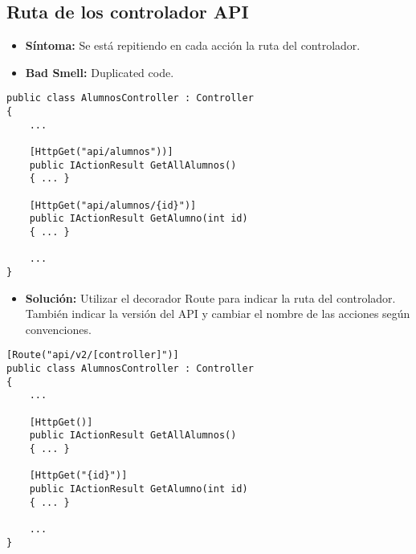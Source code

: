 \subsection{Ruta de los controlador API}
\begin{itemize}
	\item \textbf{Síntoma:} Se está repitiendo en cada acción la ruta del controlador.
	\item \textbf{Bad Smell:} Duplicated code.
\end{itemize}

\begin{lstlisting}[language={[Sharp]C}]
public class AlumnosController : Controller
{
	...	
	
	[HttpGet("api/alumnos"))]
	public IActionResult GetAllAlumnos()
	{ ... }
	
	[HttpGet("api/alumnos/{id}")]
	public IActionResult GetAlumno(int id)
	{ ... }
	
	...
}
\end{lstlisting}

\begin{itemize}	
	\item \textbf{Solución:} Utilizar el decorador Route para indicar la ruta del controlador. También indicar la versión del API y cambiar el nombre de las acciones según convenciones.
\end{itemize}

\begin{lstlisting}[language={[Sharp]C}]
[Route("api/v2/[controller]")]
public class AlumnosController : Controller
{
	...	
	
	[HttpGet()]
	public IActionResult GetAllAlumnos()
	{ ... }
	
	[HttpGet("{id}")]
	public IActionResult GetAlumno(int id)
	{ ... }
	
	...
}
\end{lstlisting}

